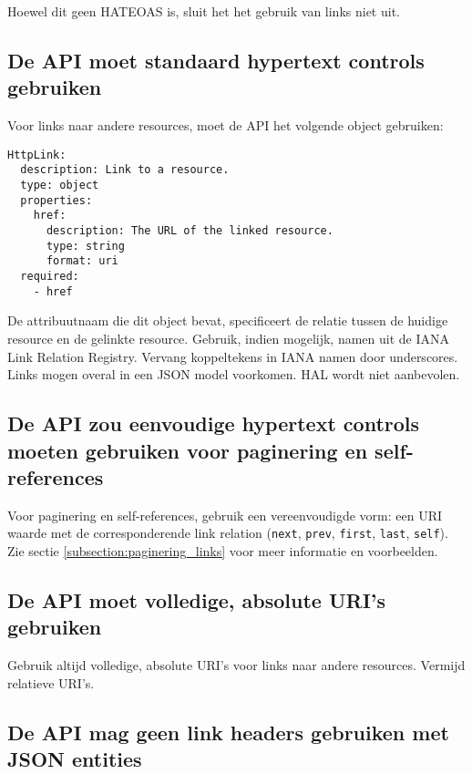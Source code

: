 Hoewel dit geen HATEOAS is, sluit het het gebruik van links niet uit.

\subsection{De API moet standaard hypertext controls gebruiken}
\label{subsection:hypertext_controls}

Voor links naar andere resources, moet de API het volgende object gebruiken:

\begin{verbatim}
HttpLink:
  description: Link to a resource.
  type: object
  properties:
    href:
      description: The URL of the linked resource.
      type: string
      format: uri
  required:
    - href
\end{verbatim}

De attribuutnaam die dit object bevat, specificeert de relatie tussen de huidige resource en de gelinkte resource. Gebruik, indien mogelijk, namen uit de IANA Link Relation Registry. Vervang koppeltekens in IANA namen door underscores. Links mogen overal in een JSON model voorkomen. HAL wordt niet aanbevolen.

\subsection{De API zou eenvoudige hypertext controls moeten gebruiken voor paginering en self-references}
\label{subsection:eenvoudige_hypertext_controls}

Voor paginering en self-references, gebruik een vereenvoudigde vorm: een URI waarde met de corresponderende link relation (\texttt{next}, \texttt{prev}, \texttt{first}, \texttt{last}, \texttt{self}). Zie sectie \ref{subsection:paginering_links} voor meer informatie en voorbeelden.

\subsection{De API moet volledige, absolute URI's gebruiken}
\label{subsection:absolute_uris}

Gebruik altijd volledige, absolute URI's voor links naar andere resources. Vermijd relatieve URI's.

\subsection{De API mag geen link headers gebruiken met JSON entities}
\label{subsection:geen_link_headers}

